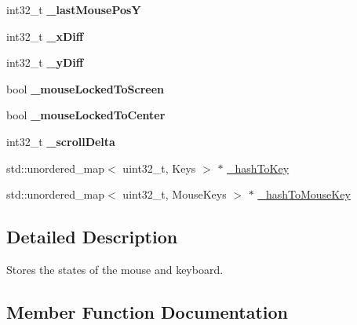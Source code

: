 \begin{DoxyCompactItemize}
\item 
int32\+\_\+t {\bfseries \+\_\+last\+Mouse\+PosY}\hypertarget{class_ensum_1_1_input_1_1_input_ab200b39064859018de01ca5b2268ead0}{}\label{class_ensum_1_1_input_1_1_input_ab200b39064859018de01ca5b2268ead0}

\item 
int32\+\_\+t {\bfseries \+\_\+x\+Diff}\hypertarget{class_ensum_1_1_input_1_1_input_a66b1bd677e8eb78accfecb848e499920}{}\label{class_ensum_1_1_input_1_1_input_a66b1bd677e8eb78accfecb848e499920}

\item 
int32\+\_\+t {\bfseries \+\_\+y\+Diff}\hypertarget{class_ensum_1_1_input_1_1_input_a10bedefb4e3e85f0cb1d42f125e349f6}{}\label{class_ensum_1_1_input_1_1_input_a10bedefb4e3e85f0cb1d42f125e349f6}

\item 
bool {\bfseries \+\_\+mouse\+Locked\+To\+Screen}\hypertarget{class_ensum_1_1_input_1_1_input_ab48463bb35239ca17a85812d170b80eb}{}\label{class_ensum_1_1_input_1_1_input_ab48463bb35239ca17a85812d170b80eb}

\item 
bool {\bfseries \+\_\+mouse\+Locked\+To\+Center}\hypertarget{class_ensum_1_1_input_1_1_input_a0aa9fd5f126984184a8393ef4356c243}{}\label{class_ensum_1_1_input_1_1_input_a0aa9fd5f126984184a8393ef4356c243}

\item 
int32\+\_\+t {\bfseries \+\_\+scroll\+Delta}\hypertarget{class_ensum_1_1_input_1_1_input_a86b2566b93f5ddbf30c3eaf738e2d3d2}{}\label{class_ensum_1_1_input_1_1_input_a86b2566b93f5ddbf30c3eaf738e2d3d2}

\item 
std\+::unordered\+\_\+map$<$ uint32\+\_\+t, Keys $>$ $\ast$ \hyperlink{class_ensum_1_1_input_1_1_input_af90c0c338bd019973b1d4428692fb231}{\+\_\+hash\+To\+Key}
\item 
std\+::unordered\+\_\+map$<$ uint32\+\_\+t, Mouse\+Keys $>$ $\ast$ \hyperlink{class_ensum_1_1_input_1_1_input_af3920116a7bc186e9beb111e77b9f0f5}{\+\_\+hash\+To\+Mouse\+Key}
\end{DoxyCompactItemize}


\subsection{Detailed Description}
Stores the states of the mouse and keyboard. 

\subsection{Member Function Documentation}
